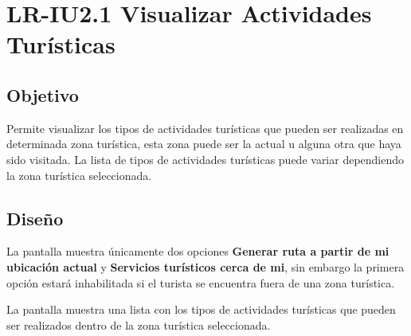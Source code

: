 \newpage
\section{LR-IU2.1 Visualizar Actividades Turísticas}

\subsection{Objetivo}
Permite visualizar los tipos de actividades turísticas que pueden ser realizadas en determinada zona turística, esta zona puede ser la actual u alguna otra que haya sido visitada. La lista de tipos de actividades turísticas puede variar dependiendo la zona turística seleccionada.

\subsection{Diseño}
La pantalla  muestra únicamente dos opciones \textbf{Generar ruta a partir de mi ubicación actual} y \textbf{Servicios turísticos cerca de mi}, sin embargo la primera opción estará inhabilitada si el turista se encuentra fuera de una zona turística.


La pantalla  muestra una lista con los tipos de actividades turísticas que pueden ser realizados dentro de la zona turística seleccionada.
